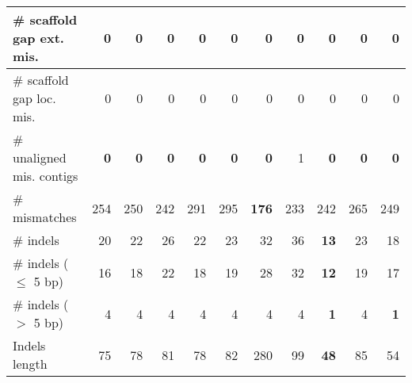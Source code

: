 \documentclass[12pt,a4paper]{article}
\begin{document}
\begin{table}[ht]
\begin{center}
\begin{tabular}{|l*{10}{|r}|}
\# scaffold gap ext. mis. & 0 & 0 & 0 & 0 & 0 & 0 & 0 & 0 & 0 & 0 \\ \hline
\# scaffold gap loc. mis. & 0 & 0 & 0 & 0 & 0 & 0 & 0 & 0 & 0 & 0 \\ \hline
\# unaligned mis. contigs & {\bf 0} & {\bf 0} & {\bf 0} & {\bf 0} & {\bf 0} & {\bf 0} & 1 & {\bf 0} & {\bf 0} & {\bf 0} \\ \hline
\# mismatches & 254 & 250 & 242 & 291 & 295 & {\bf 176} & 233 & 242 & 265 & 249 \\ \hline
\# indels & 20 & 22 & 26 & 22 & 23 & 32 & 36 & {\bf 13} & 23 & 18 \\ \hline
\hspace{5mm}\# indels ($\leq$ 5 bp) & 16 & 18 & 22 & 18 & 19 & 28 & 32 & {\bf 12} & 19 & 17 \\ \hline
\hspace{5mm}\# indels ($>$ 5 bp) & 4 & 4 & 4 & 4 & 4 & 4 & 4 & {\bf 1} & 4 & {\bf 1} \\ \hline
Indels length & 75 & 78 & 81 & 78 & 82 & 280 & 99 & {\bf 48} & 85 & 54 \\ \hline
\end{tabular}
\end{center}
\end{table}
\end{document}
